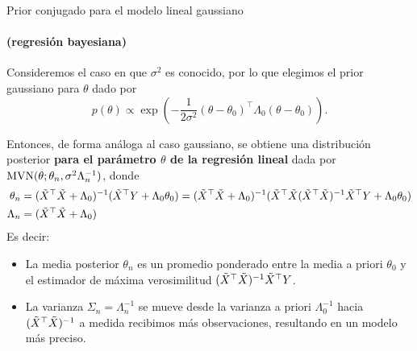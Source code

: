 \documentclass[9pt, handout]{beamer}
\begin{document}
\begin{frame}{Prior conjugado para el modelo lineal gaussiano}
\framesubtitle{(regresión bayesiana)}


Consideremos el caso en que $\sigma^2$ es conocido, por lo que elegimos el prior gaussiano para $\theta$ dado por
\begin{equation*}
	p(\theta) \propto \exp\left(-\frac{1}{2\sigma^2}(\theta-\theta_0)^\top\Lambda_0(\theta-\theta_0)\right).
\end{equation*}\pause

Entonces, de forma análoga al caso gaussiano, se obtiene una distribución posterior \textbf{para el parámetro $\theta$ de la regresión lineal} dada por $\operatorname{\text{MVN}}(\theta; \theta_n,\sigma^2\Lambda_n^{-1})$, donde  
\begin{align*}
	\theta_n &= (\tilde{X}^\top \tilde{X} + \Lambda_0)^{-1} (\tilde{X}^\top  Y + \Lambda_0\theta_0) = (\tilde{X}^\top \tilde{X} + \Lambda_0)^{-1} (\tilde{X}^\top \tilde{X} (\tilde{X}^\top \tilde{X})^{-1}\tilde{X}^\top  Y + \Lambda_0\theta_0)\label{eq:mean_post_lin_g}\\
	\Lambda_n &= (\tilde{X}^\top \tilde{X} + \Lambda_0)
\end{align*}\pause
Es decir:

\begin{itemize}
	\item La media posterior $\theta_n$ es un promedio ponderado entre la media a priori $\theta_0$ y el estimador de máxima verosimilitud $(\tilde{X}^\top \tilde{X})^{-1}\tilde{X}^\top  Y$.
	\item La varianza $\Sigma_n = \Lambda_n^{-1}$ se mueve desde la varianza a priori $\Lambda_0^{-1}$ hacia $(\tilde{X}^\top \tilde{X})^{-1}$ a medida recibimos más observaciones, resultando en un modelo más preciso.
\end{itemize}
	
\end{frame}
\end{document}

